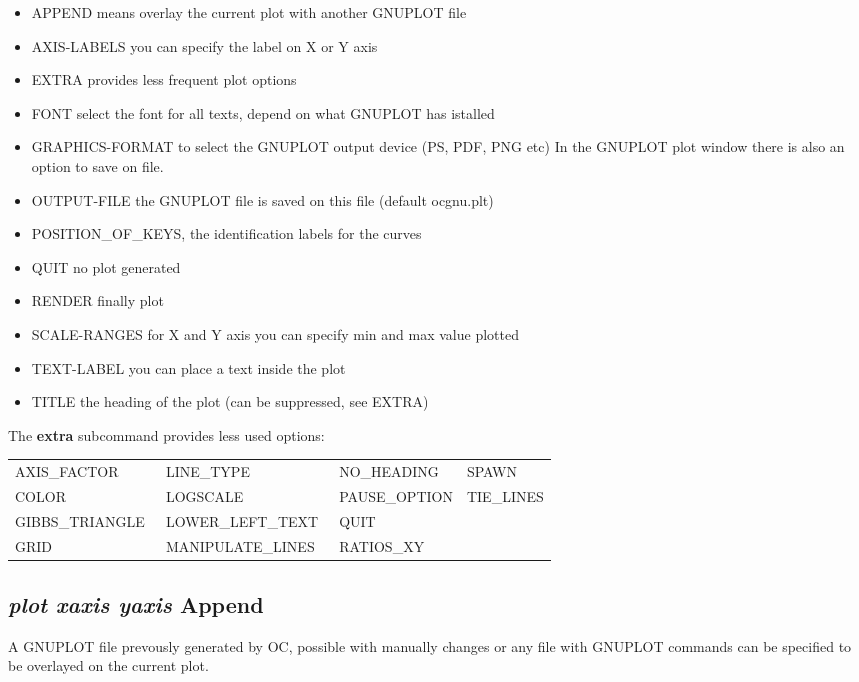 \documentclass[11pt]{article}
\begin{document}
\begin{itemize}
\item APPEND means overlay the current plot with another GNUPLOT file
\item AXIS-LABELS you can specify the label on X or Y axis
\item EXTRA provides less frequent plot options
\item FONT select the font for all texts, depend on what GNUPLOT has istalled
\item GRAPHICS-FORMAT to select the GNUPLOT output device (PS, PDF, PNG etc)
  In the GNUPLOT plot window there is also an option to save on file.
\item OUTPUT-FILE the GNUPLOT file is saved on this file (default ocgnu.plt)
\item POSITION\_OF\_KEYS, the identification labels for the curves
\item QUIT no plot generated
\item RENDER finally plot
\item SCALE-RANGES for X and Y axis you can specify min and max value plotted
\item TEXT-LABEL you can place a text inside the plot
\item TITLE the heading of the plot (can be suppressed, see EXTRA)
\end{itemize}

The {\bf extra} subcommand provides less used options:

{\small
\begin{tabular}{llll}
AXIS\_FACTOR     & LINE\_TYPE         & NO\_HEADING   & SPAWN       \\
COLOR            & LOGSCALE           & PAUSE\_OPTION & TIE\_LINES \\
GIBBS\_TRIANGLE~ & LOWER\_LEFT\_TEXT~ & QUIT        \\
GRID             & MANIPULATE\_LINES~ & RATIOS\_XY  \\
\end{tabular}
}

\hypertarget{Plot append}{}
\subsection{{\em plot xaxis yaxis} Append}

A GNUPLOT file prevously generated by OC, possible with manually
changes or any file with GNUPLOT commands can be specified to be
overlayed on the current plot.
\end{document}
